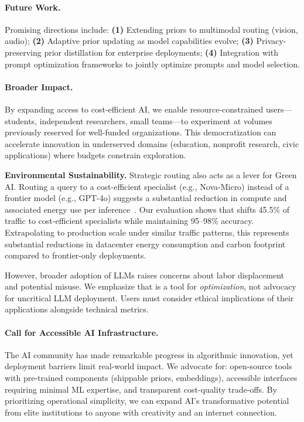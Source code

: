 \paragraph{Future Work.}
Promising directions include: \textbf{(1)} Extending priors to multimodal routing (vision, audio); \textbf{(2)} Adaptive prior updating as model capabilities evolve; \textbf{(3)} Privacy-preserving prior distillation for enterprise deployments; \textbf{(4)} Integration with prompt optimization frameworks to jointly optimize prompts and model selection.

\paragraph{Broader Impact.}
By expanding access to cost-efficient AI, we enable resource-constrained users---students, independent researchers, small teams---to experiment at volumes previously reserved for well-funded organizations. This democratization can accelerate innovation in underserved domains (education, nonprofit research, civic applications) where budgets constrain exploration.

\textbf{Environmental Sustainability.} Strategic routing also acts as a lever for Green AI. Routing a query to a cost-efficient specialist (e.g., Nova-Micro) instead of a frontier model (e.g., GPT-4o) suggests a substantial reduction in compute and associated energy use per inference~\cite{luccioni2023power}. Our evaluation shows that \ours{} shifts 45.5\% of traffic to cost-efficient specialists while maintaining 95--98\% accuracy. Extrapolating to production scale under similar traffic patterns, this represents substantial reductions in datacenter energy consumption and carbon footprint compared to frontier-only deployments.

However, broader adoption of LLMs raises concerns about labor displacement and potential misuse. We emphasize that \ours{} is a tool for \emph{optimization}, not advocacy for uncritical LLM deployment. Users must consider ethical implications of their applications alongside technical metrics.

\paragraph{Call for Accessible AI Infrastructure.}
The AI community has made remarkable progress in algorithmic innovation, yet deployment barriers limit real-world impact. We advocate for: open-source tools with pre-trained components (shippable priors, embeddings), accessible interfaces requiring minimal ML expertise, and transparent cost-quality trade-offs. By prioritizing operational simplicity, we can expand AI's transformative potential from elite institutions to anyone with creativity and an internet connection.


